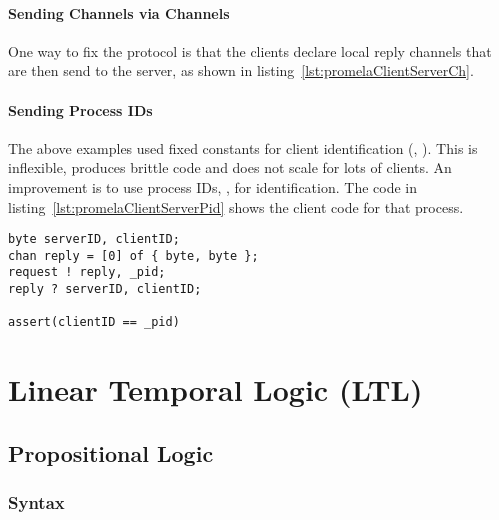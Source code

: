 			\subsubsection{Sending Channels via Channels}
				

				One way to fix the protocol is that the clients declare local reply channels that are then send to the server, as shown in listing~\ref{lst:promelaClientServerCh}.

			\subsubsection{Sending Process IDs}
				The above examples used fixed constants for client identification (, ). This is inflexible, produces brittle code and does not scale for lots of clients. An improvement is to use process IDs, , for identification. The code in listing~\ref{lst:promelaClientServerPid} shows the client code for that process.

				\begin{lstlisting}[caption = { Client-Server Model with PID in PROMELA }, label = lst:promelaClientServerPid, language = PROMELA]
byte serverID, clientID;
chan reply = [0] of { byte, byte };
request ! reply, _pid;
reply ? serverID, clientID;

assert(clientID == _pid)
				\end{lstlisting}

\chapter{Linear Temporal Logic (LTL)}
	\section{Propositional Logic}
		\subsection{Syntax}

